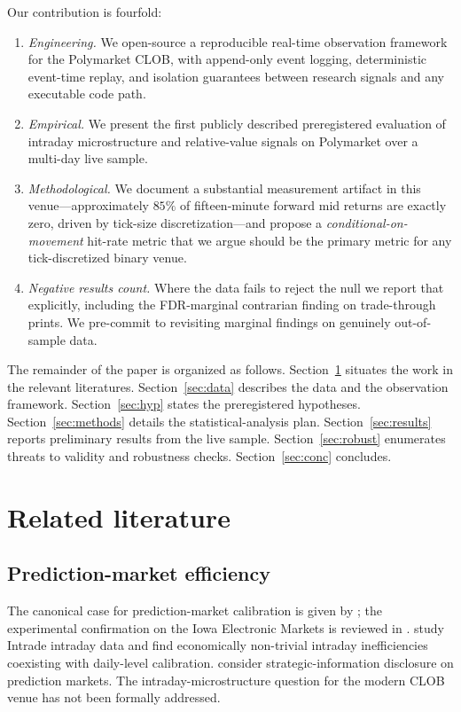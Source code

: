 \documentclass[review,12pt,authoryear]{elsarticle}
\begin{document}
Our contribution is fourfold:
\begin{enumerate}[label=(\roman*)]
\item \emph{Engineering.} We open-source a reproducible real-time observation
framework for the Polymarket CLOB, with append-only event logging,
deterministic event-time replay, and isolation guarantees between research
signals and any executable code path.
\item \emph{Empirical.} We present the first publicly described preregistered
evaluation of intraday microstructure and relative-value signals on
Polymarket over a multi-day live sample.
\item \emph{Methodological.} We document a substantial measurement artifact
in this venue---approximately \(85\%\) of fifteen-minute forward mid returns
are exactly zero, driven by tick-size discretization---and propose a
\emph{conditional-on-movement} hit-rate metric that we argue should be the
primary metric for any tick-discretized binary venue.
\item \emph{Negative results count.} Where the data fails to reject the null
we report that explicitly, including the FDR-marginal contrarian finding on
trade-through prints. We pre-commit to revisiting marginal findings on
genuinely out-of-sample data.
\end{enumerate}

The remainder of the paper is organized as follows. Section~\ref{sec:lit}
situates the work in the relevant literatures. Section~\ref{sec:data}
describes the data and the observation framework. Section~\ref{sec:hyp}
states the preregistered hypotheses. Section~\ref{sec:methods} details the
statistical-analysis plan. Section~\ref{sec:results} reports preliminary
results from the live sample. Section~\ref{sec:robust} enumerates threats
to validity and robustness checks. Section~\ref{sec:conc} concludes.

\section{Related literature}
\label{sec:lit}

\subsection{Prediction-market efficiency}

The canonical case for prediction-market calibration is given by
\citet{WolfersZitzewitz2004}; the experimental confirmation on the Iowa
Electronic Markets is reviewed in \citet{BergForsytheNelsonRietz2008}.
\citet{PageClemen2013} study Intrade intraday data and find economically
non-trivial intraday inefficiencies coexisting with daily-level calibration.
\citet{HansonOprea2009} consider strategic-information disclosure on
prediction markets. The intraday-microstructure question for the modern CLOB
venue has not been formally addressed.
\end{document}
